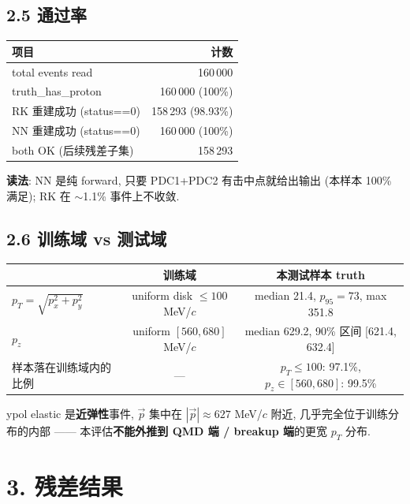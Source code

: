 \documentclass[a4paper,11pt]{article}
\begin{document}
\subsection{2.5 通过率}
\begin{table}[H]
\centering\footnotesize
\begin{tabular}{lr}
\toprule
项目 & 计数 \\
\midrule
total events read              & 160\,000 \\
truth\_has\_proton             & 160\,000 (100\%) \\
RK 重建成功 (status==0)        & 158\,293 (98.93\%) \\
NN 重建成功 (status==0)        & 160\,000 (100\%) \\
both OK (后续残差子集)         & 158\,293 \\
\bottomrule
\end{tabular}
\end{table}
\textbf{读法}: NN 是纯 forward, 只要 PDC1+PDC2 有击中点就给出输出 (本样本 100\% 满足); RK 在 $\sim$1.1\% 事件上不收敛.

\subsection{2.6 训练域 vs 测试域}
\begin{table}[H]
\centering\footnotesize
\begin{tabular}{lcc}
\toprule
                                 & 训练域           & 本测试样本 truth \\
\midrule
$p_T = \sqrt{p_x^2+p_y^2}$       & uniform disk $\le 100$ MeV/$c$  & median 21.4, $p_{95}=73$, max 351.8 \\
$p_z$                            & uniform $[560, 680]$ MeV/$c$    & median 629.2, 90\% 区间 [621.4, 632.4] \\
样本落在训练域内的比例           & ---                              & $p_T\le100$: 97.1\%, $p_z\in[560,680]$: 99.5\% \\
\bottomrule
\end{tabular}
\end{table}
ypol elastic 是\textbf{近弹性}事件, $\vec p$ 集中在 $|\vec p|\approx 627$ MeV/$c$ 附近, 几乎完全位于训练分布的内部 —— 本评估\textbf{不能外推到 QMD 端 / breakup 端}的更宽 $p_T$ 分布.

\section{3. 残差结果}
\end{document}
